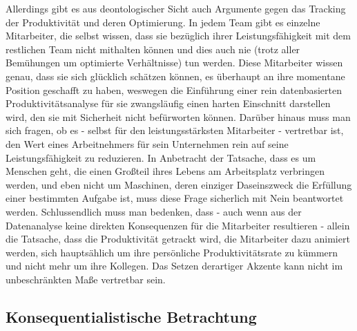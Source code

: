\documentclass[a4paper,12pt,]{article}
\begin{document}
Allerdings gibt es aus deontologischer Sicht auch Argumente gegen das Tracking der Produktivität und deren Optimierung. In jedem Team gibt es einzelne Mitarbeiter, die selbst wissen, dass sie bezüglich ihrer Leistungsfähigkeit mit dem restlichen Team nicht mithalten können und dies auch nie (trotz aller Bemühungen um optimierte Verhältnisse) tun werden. Diese Mitarbeiter wissen genau, dass sie sich glücklich schätzen können, es überhaupt an ihre momentane Position geschafft zu haben, weswegen die Einführung einer rein datenbasierten Produktivitätsanalyse für sie zwangsläufig einen harten Einschnitt darstellen wird, den sie mit Sicherheit nicht befürworten können. Darüber hinaus muss man sich fragen, ob es - selbst für den leistungsstärksten Mitarbeiter - vertretbar ist, den Wert eines Arbeitnehmers für sein Unternehmen rein auf seine Leistungsfähigkeit zu reduzieren. In Anbetracht der Tatsache, dass es um Menschen geht, die einen Großteil ihres Lebens am Arbeitsplatz verbringen werden, und eben nicht um Maschinen, deren einziger Daseinszweck die Erfüllung einer bestimmten Aufgabe ist, muss diese Frage sicherlich mit Nein beantwortet werden. Schlussendlich muss man bedenken, dass - auch wenn aus der Datenanalyse keine direkten Konsequenzen für die Mitarbeiter resultieren - allein die Tatsache, dass die Produktivität getrackt wird, die Mitarbeiter dazu animiert werden, sich hauptsählich um ihre persönliche Produktivitätsrate zu kümmern und nicht mehr um ihre Kollegen. Das Setzen derartiger Akzente kann nicht im unbeschränkten Maße vertretbar sein.


\subsection{Konsequentialistische Betrachtung}
\end{document}
